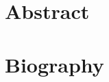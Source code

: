 \documentclass{article}
\begin{document}
\section{Abstract}









\section{Biography}


\end{document}
